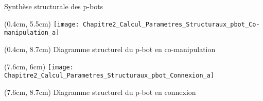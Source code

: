 \documentclass[french]{beamer}
\begin{document}
\begin{frame}{Synthèse structurale des p-bots}
\begin{textblock*}{5cm}(0.4cm, 5.5cm)
\centering
\texttt{[image: Chapitre2\_Calcul\_Parametres\_Structuraux\_pbot\_Co-manipulation\_a]}
\end{textblock*}
\begin{textblock*}{5cm}(0.4cm, 8.7cm)
\centering
\tiny{Diagramme structurel du p-bot en co-manipulation}
\end{textblock*}
\begin{textblock*}{5cm}(7.6cm, 6cm)
\centering
\texttt{[image: Chapitre2\_Calcul\_Parametres\_Structuraux\_pbot\_Connexion\_a]}
\end{textblock*}
\begin{textblock*}{5cm}(7.6cm, 8.7cm)
\centering
\tiny{Diagramme structurel du p-bot en connexion}
\end{textblock*}

\end{frame}
\end{document}
